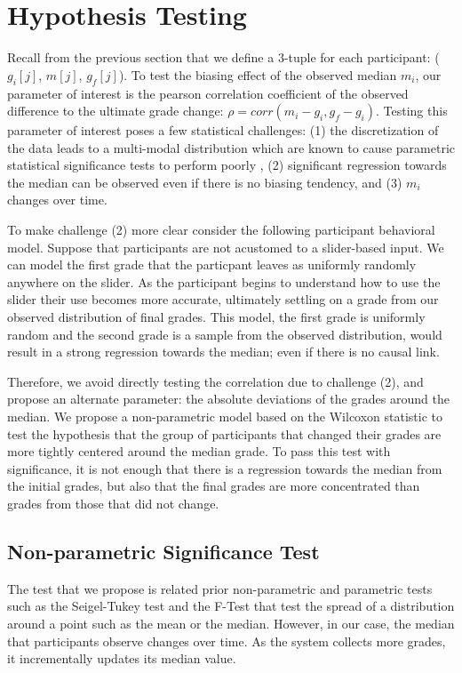 \section{Hypothesis Testing}\label{ht}
Recall from the previous section that we define a 3-tuple for each participant: ($g_i[j]$, $m[j]$, $g_f[j]$).
To test the biasing effect of the observed median $m_i$, our parameter of interest is the pearson correlation coefficient of
the observed difference to the ultimate grade change: $\rho = corr(m_i-g_i,g_f-g_i)$.
Testing this parameter of interest poses a few statistical challenges: (1) the discretization of the data leads to a multi-modal distribution which are known to cause parametric statistical significance tests to perform poorly \cite{???}, (2) significant regression towards the median can be observed even if there is no biasing tendency, and (3) $m_i$ changes over time.

To make challenge (2) more clear consider the following participant behavioral model.
Suppose that participants are not acustomed to a slider-based input.
We can model the first grade that the particpant leaves as uniformly randomly anywhere on the slider.
As the participant begins to understand how to use the slider their use becomes more accurate, ultimately settling on a grade from our observed distribution of final grades.
This model, the first grade is uniformly random and the second grade is a sample from the observed distribution, would result in a strong regression towards the median; even if there is no causal link.

Therefore, we avoid directly testing the correlation due to challenge (2), and propose an alternate parameter: the absolute deviations of the grades around the median.
We propose a non-parametric model based on the Wilcoxon statistic \cite{???} to test the hypothesis that the group of participants that changed their grades are more tightly centered around the median grade.
To pass this test with significance, it is not enough that there is a regression towards the median from the initial grades, but also that the final grades are more concentrated than grades from those that did not change. 

\subsection{Non-parametric Significance Test}
The test that we propose is related prior non-parametric and parametric tests such as the Seigel-Tukey test\cite{???} and the F-Test \cite{???} that test the spread of a distribution around a point such as the mean or the median.
However, in our case, the median that participants observe changes over time.
As the system collects more grades, it incrementally updates its median value.


